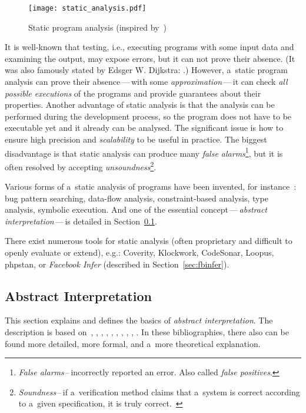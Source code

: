 \begin{figure}[htb]
    \centering
    \texttt{[image: static\_analysis.pdf]}
    \caption{
        Static program analysis (inspired
        by~\cite{AIBasedFormalMethodsCousot})
    }
    \label{fig:staticAnalysis}
\end{figure}

It is well-known that testing, i.e., executing programs
with some input data and examining the output, may expose errors, but it
can not prove their absence. (It was also famously stated by Edsger W.
Dijkstra: .) However, a~static program analysis
can prove their absence\,---\,with some \emph{approximation}\,---\,it can
check \emph{all possible executions} of the programs and provide guarantees
about their properties. Another advantage of static analysis is that the
analysis can be performed during the development process, so the program
does not have to be executable yet and it already can be analysed.
The significant issue is how to ensure high precision and
\emph{scalability} to be useful in practice. The biggest disadvantage is
that static analysis can produce many \emph{false alarms}\footnote{
\emph{False alarms}\,--\,incorrectly reported an error. Also called
\emph{false positives}.}, but it is often
resolved by accepting \emph{unsoundness}\footnote{\emph{Soundness}\,--\,if
a~verification method claims that a~system is correct according to a~given
specification, it is truly correct.~\cite{favStaticAnalysis}}.

Various forms of a~static analysis of programs have been invented, for
instance~\cite{favStaticAnalysis}: bug pattern searching, data-flow
analysis, constraint-based analysis, type analysis, symbolic execution. And
one of the essential concept\,---\,\emph{abstract interpretation}\,---\,is
detailed in Section~\ref{sec:AI}.

There exist numerous tools for static analysis (often proprietary and
difficult to openly evaluate or extend), e.g.: Coverity, Klockwork, CodeSonar,
Loopus, phpstan, or \emph{Facebook Infer} (described in
Section~\ref{sec:fbinfer}).


\subsection{Abstract Interpretation}
\label{sec:AI}

This section explains and defines the basics of \emph{abstract interpretation}.
The description is based on~\cite{AIBasedFormalMethodsCousot},
\cite{AILatticeModelCousot}, \cite{AIInNutshellCousot}, \cite{AICousotWeb},
\cite{favAI}, \cite{projectPracticeMarcin2018}, \cite{wideningNarrowingCousot},
\cite{programAnalysisNielson}, \cite{staticAnalysisMoller},
\cite{favLatticesAndFixpoints}. In these bibliographies, there also can be
found more detailed, more formal, and a~more theoretical explanation.

